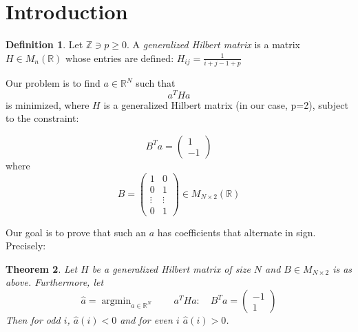 \documentclass[11pt]{article}
\newtheorem{thm}{Theorem}[section]
\theoremstyle{definition}
\newtheorem{defn}[thm]{Definition}
\theoremstyle{remark}
\numberwithin{equation}{section}
\DeclareMathOperator{\argmin}{argmin}
\begin{document}
\section{Introduction}\label{Introduction}

\begin{defn} 
Let $\mathbb{Z} \ni p \ge 0$. A \emph{generalized Hilbert matrix} is a matrix $H\in M_n(\mathbb{R})$ whose entries are defined: 
$H_{ij} = \frac{1}{i+j-1+p}$
\end{defn}
Our problem is to find $a\in\mathbb{R}^N$ such that 
\begin{equation}
a^T H a\end{equation}
is minimized, where $H$ is a generalized Hilbert matrix (in our case, p=2), subject to the constraint: 

\begin{equation}
B^T a = \begin{pmatrix} 1 \\ -1\end{pmatrix}
\end{equation}
where \[B = \begin{pmatrix} 1 & 0\\ 
0 & 1 \\
\vdots & \vdots
\\ 
0 & 1 \end{pmatrix} \in M_{N\times 2}(\mathbb{R})\]

Our goal is to prove that such an $a$ has coefficients that alternate in sign. Precisely: 

\begin{thm}\label{positivity-hilbert-coefficients}
Let $H$ be a generalized Hilbert matrix of size $N$ and $B \in M_{N\times 2}$ is as above. Furthermore, let 
\[ \hat{a} = \argmin_{a\in\mathbb{R}^N} \quad \quad a^THa : \quad B^Ta = \begin{pmatrix} -1 \\ 1 \end{pmatrix}\]
Then for odd $i$, $\hat{a}(i) < 0$ and for even $i$ $\hat{a}(i) > 0$.
\end{thm} 
\end{document}
